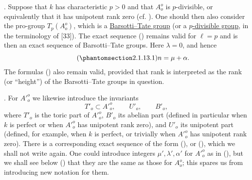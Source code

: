 \medskip
\noindent
{}. Suppose that $k$ has characteristic $p>0$ and that $A_o^o$ is
$p$-divisible, or equivalently that it has unipotent rank zero
(cf. ).  One should then also consider the pro-group $T_p(A_o^o)$,
which is a \underline{Barsotti--Tate group} (or a
\underline{$p$-divisible group}, in the terminology of [33]).  The
exact sequence () remains valid for $\ell=p$ and is then an exact
sequence of Barsotti--Tate groups.  Here $\lambda=0$, and hence
\begin{equation}\tag{\SGARefTarget{sga7.sga7i.eix.n2-1-13-1}{2.1.13.1}}
 n=\mu+\alpha.
\end{equation}
The formulas () also remain valid, provided that rank is
interpreted as the rank (or ``height'') of the Barsotti--Tate groups in
question.

\medskip
\noindent
{}. For ${A'}_o^o$ we likewise introduce the invariants
\[
 T'_o\subset {A'}_o^o,\qquad U'_o,\qquad B'_o,
\]
where $T'_o$ is the toric part of ${A'}_o^o$, $B'_o$ its abelian part
(defined in particular when $k$ is perfect or when ${A'}_o^o$ has
unipotent rank zero), and $U'_o$ its unipotent part (defined, for
example, when $k$ is perfect, or trivially when ${A'}_o^o$ has
unipotent rank zero).  There is a corresponding exact sequence of the
form (), or (), which we shall not write again.  One could
introduce integers $\mu',\lambda',\alpha'$ for ${A'}_o^o$ as in
(), but we shall see below () that they are the same as those
for $A_o^o$; this spares us from introducing new notation for them.

